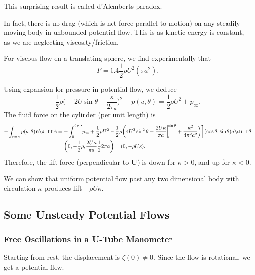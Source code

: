 \documentclass[12pt]{article}
\begin{document}
This surprising result is called d'Alemberts paradox.

In fact, there is no drag (which is net force parallel to motion) on any steadily moving body in unbounded potential flow. This is as kinetic energy is constant, as we are neglecting viscosity/friction.

For viscous flow on a translating sphere, we find experimentally that
\[
F = 0.4 \frac{1}{2} \rho U^2 (\pi a^2).
\]


Using expansion for pressure in potential flow, we deduce
\[
\frac{1}{2} \rho \biggl(-2U \sin \theta + \frac{\kappa}{2 \pi_a} \biggr)^2 + p(a, \theta) = \frac{1}{2} \rho U^2 + p_{\infty}.
\]
The fluid force on the cylinder (per unit length) is
\begin{align*}
- \int_{r = a}p(a, \theta) \mathbf{n} \diff A &= - \int_{0}^{2 \pi} \biggl[p_{\infty} + \frac{1}{2} \rho U^2 - \frac{1}{2} \rho \biggl(4U^2 \sin^2 \theta - \frac{2U\kappa}{\pi a} \biggr|_0^{\sin\theta} + \frac{\kappa^2}{4 \pi^2a^2} \biggr) \biggr] (\cos \theta, \sin \theta) a \diff \theta \\
					      &= \biggl(0, -\frac{1}{2}\rho, \frac{2 U \kappa}{\pi a} \frac{1}{2} 2 \pi a\biggr) = (0, -\rho U \kappa).
\end{align*}
Therefore, the lift force (perpendicular to $\mathbf{U}$) is down for $\kappa > 0$, and up for $\kappa < 0$.

We can show that uniform potential flow past any two dimensional body with circulation $\kappa$ produces lift $-\rho U \kappa$.

\subsection{Some Unsteady Potential Flows}
\label{sub:some_unsteady_potential_flows}

\subsubsection{Free Oscillations in a U-Tube Manometer}
\label{subsub:free_oscillations_in_a_u_tube_manometer}

Starting from rest, the displacement is $\zeta(0) \neq 0$. Since the flow is rotational, we get a potential flow.
\end{document}
